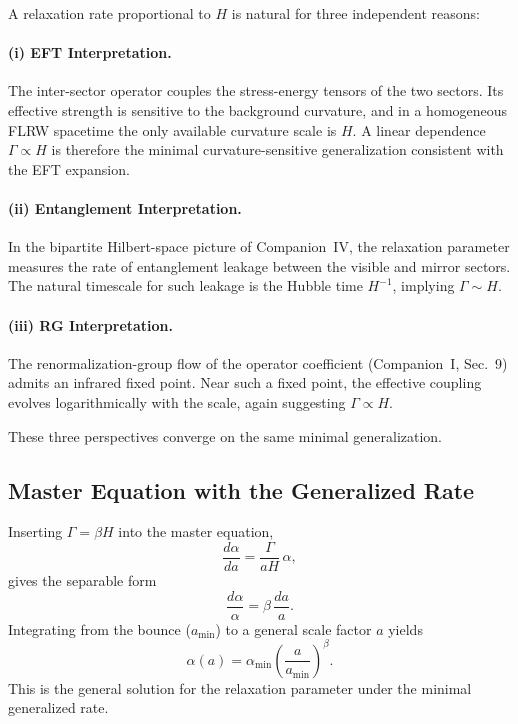 \documentclass[11pt,a4paper]{article}
\begin{document}
A relaxation rate proportional to $H$ is natural for three independent reasons:

\paragraph{(i) EFT Interpretation.}
The inter-sector operator couples the stress-energy tensors of the two sectors. Its effective
strength is sensitive to the background curvature, and in a homogeneous FLRW spacetime the
only available curvature scale is $H$. A linear dependence $\Gamma \propto H$ is therefore the
minimal curvature-sensitive generalization consistent with the EFT expansion.

\paragraph{(ii) Entanglement Interpretation.}
In the bipartite Hilbert-space picture of Companion~IV, the relaxation parameter measures the
rate of entanglement leakage between the visible and mirror sectors. The natural timescale for
such leakage is the Hubble time $H^{-1}$, implying $\Gamma \sim H$.

\paragraph{(iii) RG Interpretation.}
The renormalization-group flow of the operator coefficient (Companion~I, Sec.~9) admits an
infrared fixed point. Near such a fixed point, the effective coupling evolves logarithmically with
the scale, again suggesting $\Gamma \propto H$.

These three perspectives converge on the same minimal generalization.

\subsection{Master Equation with the Generalized Rate}

Inserting $\Gamma = \beta H$ into the master equation,
\begin{equation}
    \frac{d\alpha}{da}
    = \frac{\Gamma}{aH}\,\alpha,
\end{equation}
gives the separable form
\begin{equation}
    \frac{d\alpha}{\alpha}
    = \beta\,\frac{da}{a}.
\end{equation}
Integrating from the bounce ($a_{\min}$) to a general scale factor $a$ yields
\begin{equation}
    \alpha(a)
    = \alpha_{\min}
      \left(\frac{a}{a_{\min}}\right)^{\beta}.
\end{equation}
This is the general solution for the relaxation parameter under the minimal generalized rate.
\end{document}
